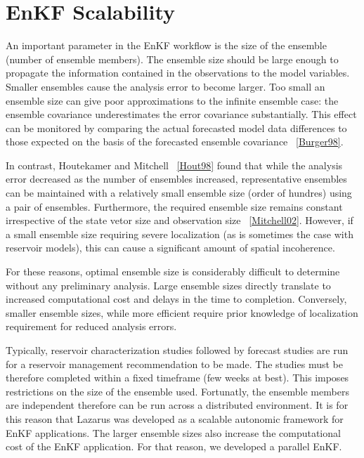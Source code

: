 \documentclass{rspublic}
\begin{document}
\section{EnKF Scalability}
An important parameter in the EnKF workflow is the size of the ensemble (number of ensemble members). The ensemble size should be large enough to propagate the information contained in the observations to the model variables. Smaller ensembles cause the analysis error to become larger. Too small an ensemble size can give poor approximations to the infinite ensemble case: the ensemble covariance underestimates the error covariance substantially. This effect can be monitored by comparing the actual forecasted model data differences to those expected on the basis of the forecasted ensemble covariance ~\ref{Burger98}.

In contrast, Houtekamer and Mitchell ~\ref{Hout98} found that while the analysis error decreased as the number of ensembles increased, representative ensembles can be maintained with a relatively small ensemble size (order of hundres) using a  pair of ensembles. Furthermore, the required ensemble size remains constant irrespective of the state vetor size and observation size ~\ref{Mitchell02}. However, if a small ensemble size requiring severe localization (as is sometimes the case with reservoir models), this can cause a significant amount of spatial incoherence.

For these reasons, optimal ensemble size is considerably difficult to determine without any preliminary analysis. Large ensemble sizes directly translate to increased computational cost and delays in the time to completion. Conversely, smaller ensemble sizes, while more efficient require prior knowledge of localization requirement for reduced analysis errors.

Typically, reservoir characterization studies followed by forecast studies are run for a reservoir management recommendation to be made. The studies must be therefore completed within a fixed timeframe (few weeks at best). This imposes restrictions on the size of the ensemble used. Fortunatly, the ensemble members are independent therefore can be run across a distributed environment. It is for this reason that Lazarus was developed as a scalable autonomic framework for EnKF applications. The larger ensemble sizes also increase the computational cost of the EnKF application. For that reason, we developed a parallel EnKF.
\end{document}
